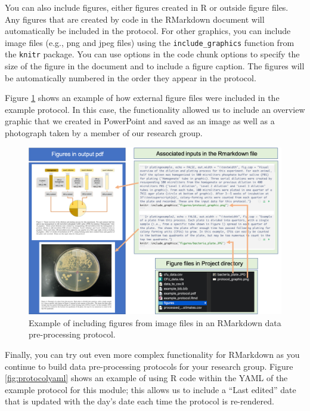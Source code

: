 \documentclass[]{tufte-book}
\begin{document}
You can also include figures, either figures created in R or outside figure files.
Any figures that are created by code in the RMarkdown document will automatically
be included in the protocol. For other graphics, you can include image files
(e.g., png and jpeg files) using the \texttt{include\_graphics} function from the
\texttt{knitr} package. You can use options in the code chunk options to specify
the size of the figure in the document and to include a figure caption. The
figures will be automatically numbered in the order they appear in the protocol.

Figure \ref{fig:protocolfigures} shows an example of how external figure
files were included in the example protocol. In this case, the functionality
allowed us to include an overview graphic that we created in PowerPoint and
saved as an image as well as a photograph taken by a member of our research
group.

\begin{figure}
\includegraphics[width=\textwidth]{figures/protocol_figures} \caption[Example of including figures from image files in an RMarkdown data pre-processing protocol]{Example of including figures from image files in an RMarkdown data pre-processing protocol.}\label{fig:protocolfigures}
\end{figure}

Finally, you can try out even more complex functionality for RMarkdown as you
continue to build data pre-processing protocols for your research group. Figure
\ref{fig:protocolyaml} shows an example of using R code within the YAML of the
example protocol for this module; this allows us to include a ``Last edited'' date
that is updated with the day's date each time the protocol is re-rendered.
\end{document}
